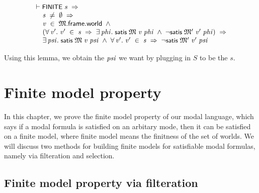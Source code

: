\documentclass[letterpaper]{article}
\renewcommand{\HOLConst}[1]{{\textsf{\upshape\small #1}}}
\renewcommand{\HOLinline}[1]{\ensuremath{#1}}
\newenvironment{holmath}{\begin{displaymath}\begin{array}{l}}{\end{array}\end{displaymath}\ignorespacesafterend}
\begin{document}
\begin{holmath}
  \ensuremath{\HOLTokenTurnstile}\HOLConst{FINITE}\;\HOLFreeVar{s}\;\HOLSymConst{\HOLTokenImp{}}\\
\;\;\;\;\;\HOLFreeVar{s}\;\HOLSymConst{\HOLTokenNotEqual{}}\;\HOLSymConst{\HOLTokenEmpty{}}\;\HOLSymConst{\HOLTokenImp{}}\\
\;\;\;\;\;\HOLFreeVar{v}\;\HOLSymConst{\HOLTokenIn{}}\;\HOLFreeVar{\ensuremath{\mathfrak{M}}}.\HOLFieldName{frame}.\HOLFieldName{world}\;\HOLSymConst{\HOLTokenConj{}}\\
\;\;\;\;\;(\HOLSymConst{\HOLTokenForall{}}\HOLBoundVar{v\sp{\prime}}.\;\HOLBoundVar{v\sp{\prime}}\;\HOLSymConst{\HOLTokenIn{}}\;\HOLFreeVar{s}\;\HOLSymConst{\HOLTokenImp{}}\;\HOLSymConst{\HOLTokenExists{}}\HOLBoundVar{phi}.\;\HOLConst{satis}\;\HOLFreeVar{\ensuremath{\mathfrak{M}}}\;\HOLFreeVar{v}\;\HOLBoundVar{phi}\;\HOLSymConst{\HOLTokenConj{}}\;\HOLSymConst{\HOLTokenNeg{}}\HOLConst{satis}\;\HOLFreeVar{\ensuremath{\mathfrak{M}'}}\;\HOLBoundVar{v\sp{\prime}}\;\HOLBoundVar{phi})\;\HOLSymConst{\HOLTokenImp{}}\\
\;\;\;\;\;\HOLSymConst{\HOLTokenExists{}}\HOLBoundVar{psi}.\;\HOLConst{satis}\;\HOLFreeVar{\ensuremath{\mathfrak{M}}}\;\HOLFreeVar{v}\;\HOLBoundVar{psi}\;\HOLSymConst{\HOLTokenConj{}}\;\HOLSymConst{\HOLTokenForall{}}\HOLBoundVar{v\sp{\prime}}.\;\HOLBoundVar{v\sp{\prime}}\;\HOLSymConst{\HOLTokenIn{}}\;\HOLFreeVar{s}\;\HOLSymConst{\HOLTokenImp{}}\;\HOLSymConst{\HOLTokenNeg{}}\HOLConst{satis}\;\HOLFreeVar{\ensuremath{\mathfrak{M}'}}\;\HOLBoundVar{v\sp{\prime}}\;\HOLBoundVar{psi}
\end{holmath}

Using this lemma, we obtain the \HOLinline{\HOLFreeVar{psi}} we want by plugging in $S$ to be the $s$. 

\section{Finite model property}

In this chapter, we prove the finite model property of our modal language, which says if a modal formula is satisfied on an arbitary mode, then it can be satisfied on a finite model, where finite model means the finitness of the set of worlds. We will discuss two methods for building finite models for satisfiable modal formulas, namely via filteration and selection.

\subsection{Finite model property via filteration}
\end{document}

